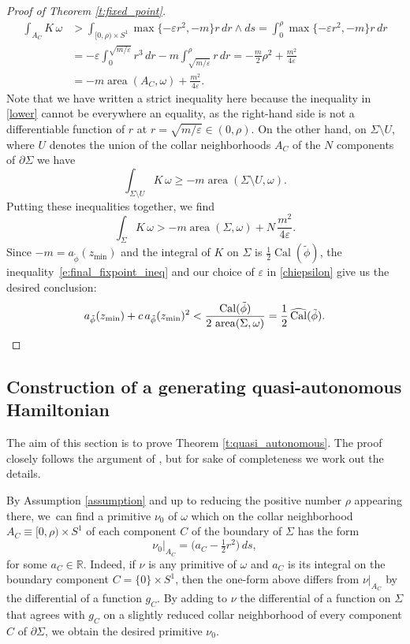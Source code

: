 \documentclass[10pt,a4paper]{amsart}
\let\mathds\mathbb
\let\epsilon\varepsilon
\theoremstyle{definition}
\DeclareMathOperator{\area}{area}
\DeclareMathOperator{\Cal}{Cal}
\newcommand{\R}{\mathds{R}}
\providecommand{\Subsection}{\subsection}
\begin{document}
\begin{proof}[Proof of Theorem \ref{t:fixed_point}]
\[
\begin{split}
\int_{A_C} K\, \omega
&>
\int_{[0,\rho) \times S^1} \max\{ -\epsilon r^2 , -m\} r\, dr\wedge ds
= \int_0^{\rho} \max\{ -\epsilon r^2 , -m\} r\, dr \\
&= - \epsilon \int_0^{\sqrt{m/\epsilon}}r^3\, dr - m \int_{\sqrt{m/\epsilon}}^{\rho} r\, dr = -\frac{m}{2} \rho^2 + \frac{m^2}{4\epsilon}\\
&
=
-m\area(A_C,\omega) + \frac{m^2}{4\epsilon}.
\end{split}
\]
Note that we have written a strict inequality here because the inequality in \eqref{lower} cannot be everywhere an equality, as the right-hand side is not a differentiable function of $r$ at $r=\sqrt{m/\epsilon} \in (0,\rho)$. On the other hand, on $\Sigma\setminus U$, where $U$ denotes the union of the collar neighborhoods $A_C$ of the $N$ components of $\partial \Sigma$ we have
\[
\int_{\Sigma\setminus U} K\, \omega \geq -m \area(\Sigma\setminus U,\omega).
\]
Putting these inequalities together, we find
\begin{equation}
\label{e:final_fixpoint_ineq}
\int_{\Sigma} K\, \omega > -m\area(\Sigma,\omega) + N \,\frac{m^2}{4\epsilon}.
\end{equation}
Since $-m=a_{\tilde{\phi}}(z_{\min})$ and the integral of $K$ on $\Sigma$ is $\tfrac12\Cal(\tilde{\phi})$, the inequality~\eqref{e:final_fixpoint_ineq} and our choice of $\epsilon$ in \eqref{chiepsilon} give us the desired conclusion:
\[
a_{\tilde{\phi}}(z_{\min}) + c\, a_{\tilde{\phi}}(z_{\min})^2
< \frac{\Cal(\tilde{\phi})}{ 2\, \area(\Sigma,\omega)} = \frac{1}{2} \, \widehat{\Cal}(\tilde{\phi}).
\qedhere
\]
\end{proof}

\Subsection{Construction of a generating quasi-autonomous Hamiltonian}\label{ss:quasi_autonomous}

The aim of this section is to prove Theorem \ref{t:quasi_autonomous}. The proof closely follows the argument of \cite[\S 4]{Benedetti:2021aa}, but for sake of completeness we work out the details.

By Assumption \ref{assumption} and up to reducing the positive number $\rho$ appearing there, we~can find a primitive $\nu_0$ of $\omega$ which on the collar neighborhood $A_C\equiv [0,\rho)\times S^1$ of each component $C$ of the boundary of $\Sigma$ has the form
\begin{equation}
\label{e:lambda|_A}
\nu_0|_{A_C} = \bigl( a_C - \tfrac{1}{2} r^2 \bigr)\, ds,
\end{equation}
for some $a_C\in \R$. Indeed, if $\nu$ is any primitive of $\omega$ and $a_C$ is its integral on the boundary component $C = \{0\} \times S^1$, then the one-form above differs from $\nu|_{A_C}$ by the differential of a function $g_C$. By adding to $\nu$ the differential of a function on $\Sigma$ that agrees with $g_C$ on a slightly reduced collar neighborhood of every component $C$ of $\partial \Sigma$, we obtain the desired primitive $\nu_0$.
\end{document}
